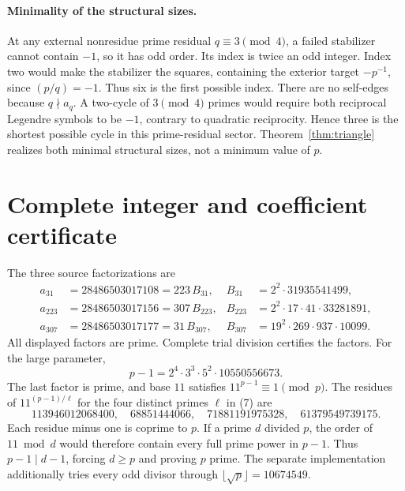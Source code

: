 \paragraph{Minimality of the structural sizes.}
At any external nonresidue prime residual $q\equiv3\pmod4$, a failed stabilizer
cannot contain $-1$, so it has odd order. Its index is twice an odd integer.
Index two would make the stabilizer the squares, containing the exterior target
$-p^{-1}$, since $(p/q)=-1$. Thus six is the first possible index.
There are no self-edges because $q\nmid a_q$. A two-cycle of $3\pmod4$ primes
would require both reciprocal Legendre symbols to be $-1$, contrary to quadratic
reciprocity. Hence three is the shortest possible cycle in this prime-residual
sector. Theorem~\ref{thm:triangle} realizes both minimal structural sizes, not a
minimum value of $p$.

\section{Complete integer and coefficient certificate}\label{sec:certificate}
The three source factorizations are
\begin{align*}
 a_{31}&=28486503017108=223\,B_{31},& B_{31}&=2^2\cdot31935541499,\\
 a_{223}&=28486503017156=307\,B_{223},& B_{223}&=2^2\cdot17\cdot41\cdot33281891,\\
 a_{307}&=28486503017177=31\,B_{307},& B_{307}&=19^2\cdot269\cdot937\cdot10099.
\end{align*}
All displayed factors are prime. Complete trial division certifies the factors.
For the large parameter,
\[
 p-1=2^4\cdot3^3\cdot5^2\cdot10550556673.                 \tag{7}
\]
The last factor is prime, and base $11$ satisfies $11^{p-1}\equiv1\pmod p$.
The residues of $11^{(p-1)/\ell}$ for the four distinct primes $\ell$ in (7) are
\[
 113946012068400,\quad68851444066,\quad71881191975328,\quad61379549739175.
\tag{8}
\]
Each residue minus one is coprime to $p$. If a prime $d$ divided $p$, the order
of $11\bmod d$ would therefore contain every full prime power in $p-1$.
Thus $p-1\mid d-1$, forcing $d\ge p$ and proving $p$ prime.
The separate implementation additionally tries every odd divisor through
$\lfloor\sqrt p\rfloor=10674549$.

